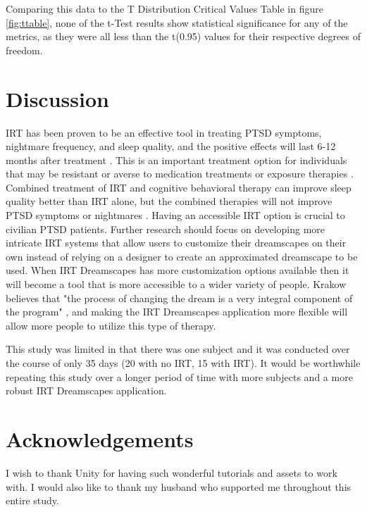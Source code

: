 \documentclass{article}
\begin{document}
Comparing this data to the T Distribution Critical Values Table \cite{TTable} in figure \ref{fig:ttable}, none of the t-Test results show statistical significance for any of the metrics, as they were all less than the t(0.95) values for their respective degrees of freedom.

\section*{Discussion}

IRT has been proven to be an effective tool in treating PTSD symptoms, nightmare frequency, and sleep quality, and the positive effects will last 6-12 months after treatment \cite{Casement}. This is an important treatment option for individuals that may be resistant or averse to medication treatments or exposure therapies \cite{KrakowJAMA}. Combined treatment of IRT and cognitive behavioral therapy can improve sleep quality better than IRT alone, but the combined therapies will not improve PTSD symptoms or nightmares \cite{Casement}. Having an accessible IRT option is crucial to civilian PTSD patients. Further research should focus on developing more intricate IRT systems that allow users to customize their dreamscapes on their own instead of relying on a designer to create an approximated dreamscape to be used. When IRT Dreamscapes has more customization options available then it will become a tool that is more accessible to a wider variety of people. Krakow believes that "the process of changing the dream is a very integral component of the program" \cite{KrakowTS}, and making the IRT Dreamscapes application more flexible will allow more people to utilize this type of therapy.

This study was limited in that there was one subject and it was conducted over the course of only 35 days (20 with no IRT, 15 with IRT). It would be worthwhile repeating this study over a longer period of time with more subjects and a more robust IRT Dreamscapes application.

\section*{Acknowledgements}

I wish to thank Unity for having such wonderful tutorials and assets to work with. I would also like to thank my husband who supported me throughout this entire study.

\printbibliography[
heading=bibintoc,
title={References}
]
\end{document}
